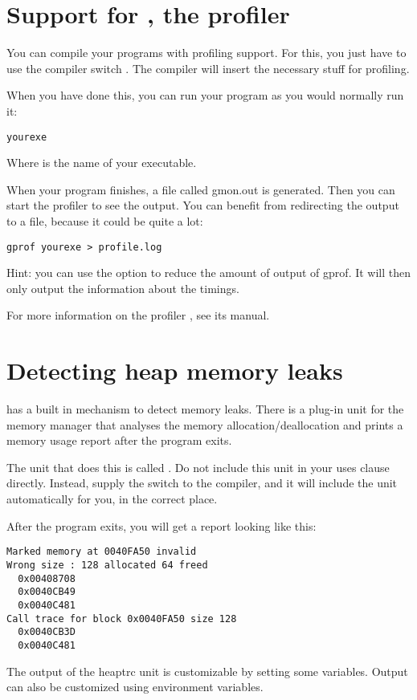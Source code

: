 \section{Support for , the \gnu profiler}
\label{se:gprof}

You can compile your programs with profiling support. For this, you just
have to use the compiler switch . The compiler will insert the
necessary stuff for profiling.

When you have done this, you can run your program as you would normally
run it:
\begin{verbatim}
yourexe
\end{verbatim}
Where  is the name of your executable.

When your program finishes, a file called gmon.out is generated. Then you can start
the profiler to see the output. You can benefit from redirecting the output to a file,
because it could be quite a lot:
\begin{verbatim}
gprof yourexe > profile.log
\end{verbatim}

Hint: you can use the  option to reduce the amount of output of gprof. It will
then only output the information about the timings.

For more information on the \gnu profiler , see its manual.

\section{Detecting heap memory leaks}
\label{se:heaptrc}
\fpc has a built in mechanism to detect memory leaks. There is a plug-in
unit for the memory manager that analyses the memory allocation/deallocation
and prints a memory usage report after the program exits.

The unit that does this is called .
Do not include this unit in your uses clause directly.
Instead, supply the  switch to the compiler, and it will include
the unit automatically for you, in the correct place.

After the program exits, you will get a report looking like this:
\begin{verbatim}
Marked memory at 0040FA50 invalid
Wrong size : 128 allocated 64 freed
  0x00408708
  0x0040CB49
  0x0040C481
Call trace for block 0x0040FA50 size 128
  0x0040CB3D
  0x0040C481
\end{verbatim}
The output of the heaptrc unit is customizable by setting some variables.
Output can also be customized using environment variables.

